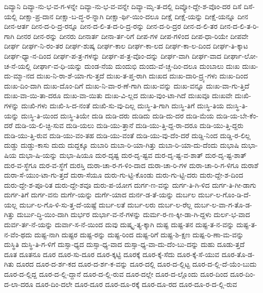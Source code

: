 {ದಿವ್ಯಾನಿ
ದಿವ್ಯಾ-ನು-ಭ-ವ-ಗ-ಳನ್ನೇ
ದಿವ್ಯಾ-ನು-ಭ-ವ-ವನ್ನೇ
ದಿವ್ಯಾ-ಮೃ-ತ-ದಲ್ಲಿ
ದಿವ್ಯೋ-ದ್ದೇ-ಶ-ವೊಂ-ದರ
ದಿಸೆ
ದಿಸೆ-ಯಲ್ಲಿ
ದೀಕ್ಷಾ-ಪ್ರ-ದಾನ
ದೀಕ್ಷಾ-ಬ-ದ್ಧ-ರ-ನ್ನಾಗಿ
ದೀಕ್ಷಾ-ರ್ಥಿ-ಯಿಂ-ದಲೂ
ದೀಕ್ಷೆ
ದೀಕ್ಷೆ-ಯನ್ನು
ದೀಕ್ಷೆ-ಯನ್ನೂ
ದೀನ
ದೀನ-ಆರ್ತ
ದೀನ-ದ-ರಿ-ದ್ರ-ರನ್ನೂ
ದೀನ-ದ-ಲಿ-ತ-ದ-ರಿ-ದ್ರ-ರನ್ನು
ದೀನ-ದ-ರಿ-ದ್ರರ
ದೀನ-ದ-ಲಿ-ತರ
ದೀನ-ದ-ಲಿ-ತ-ರಿ-ಗಾಗಿ
ದೀನರ
ದೀನ-ರನ್ನು
ದೀನರು
ದೀನಾರ್ತ
ದೀನಾ-ರ್ತ-ರಿಗೆ
ದೀಪ-ಗಳ
ದೀಪ-ಗಳಿಂದ
ದೀಪ-ಧಾ-ರಿಯೇ
ದೀಪವೇ
ದೀರ್ಘ
ದೀರ್ಘ-ನಿ-ರಂ-ತರ
ದೀರ್ಘ-ಶುಷ್ಕ
ದೀರ್ಘ-ಕಾಲ
ದೀರ್ಘ-ಕಾ-ಲದ
ದೀರ್ಘ-ಕಾ-ಲ-ದಿಂದ
ದೀರ್ಘ-ತಿ-ಕ್ಕಾಟ
ದೀರ್ಘ-ಧ್ಯಾ-ನ-ದಿಂದ
ದೀರ್ಘ-ಪ-ತ್ರ-ಗಳನ್ನು
ದೀರ್ಘ-ಪ-ತ್ರ-ವೊಂ-ದನ್ನು
ದೀರ್ಘ-ವಾಗಿ
ದೀರ್ಘ-ವಾದ
ದೀರ್ಘಾ-ಲೋ-ಚ-ನೆ-ಯಲ್ಲಿ
ದೀರ್ಘಾ-ವ-ಧಿ-ಯನ್ನು
ದುಂಡ-ನೆಯ
ದುಂದುಭಿ
ದುಂದು-ವೆ-ಚ್ಚ-ದಿಂ-ದಲೂ
ದುಂಬಾಲು
ದುಃಖ
ದುಃಖ-ದು-ಮ್ಮಾ-ನದ
ದುಃಖ-ನಿ-ರಾ-ಶೆ-ಯಾ-ಗು-ತ್ತದೆ
ದುಃಖ-ತ-ಪ್ತ-ರಾಗಿ
ದುಃಖದ
ದುಃಖ-ದಾರಿ-ದ್ರ್ಯ-ಗಳು
ದುಃಖ-ದಿಂದ
ದುಃಖ-ದಿಂ-ದಾಗಿ
ದುಃಖ-ದೊಂ-ದಿಗೆ
ದುಃಖ-ನಿ-ವಾ-ರ-ಣೆ-ಗಾಗಿ
ದುಃಖ-ವನ್ನು
ದುಃಖ-ವನ್ನೂ
ದುಃಖ-ವಾ-ಗು-ತ್ತಿದೆ
ದುಃಖ-ವಾ-ಯಿ-ತಾ-ದರೂ
ದುಃಖ-ವಾ-ಯಿತು
ದುಃಖ-ವಿ-ಲ್ಲದ
ದುಃಖ-ವುಂ-ಟಾ-ಗಿದೆ
ದುಃಖವೂ
ದುಃಖವೇ
ದುಃಖಿ-ಗಳನ್ನು
ದುಃಖಿ-ಗಳು
ದುಃಖಿ-ಸಿ-ದ-ನಂತೆ
ದುಃಖಿ-ಸು-ವು-ದಿಲ್ಲ
ದುಃಸ್ಥಿ-ತಿ-ಗಾಗಿ
ದುಃಸ್ಥಿ-ತಿಗೆ
ದುಃಸ್ಥಿ-ತಿಯ
ದುಃಸ್ಥಿ-ತಿ-ಯನ್ನು
ದುಃಸ್ಥಿ-ತಿ-ಯಿಂದ
ದುಃಸ್ಥಿ-ತಿಯೇ
ದುಡಿ
ದುಡಿ-ದರು
ದುಡಿದು
ದುಡಿ-ದು-ದರ
ದುಡಿ-ಮೆಯ
ದುಡಿ-ಯ-ಬೇ-ಕೆಂ-ದರೆ
ದುಡಿ-ಯ-ಲಿ-ಚ್ಛಿ-ಸುವ
ದುಡಿ-ಯಲು
ದುಡಿ-ಯು-ತ್ತಾನೆ
ದುಡಿ-ಯು-ತ್ತಿ-ದ್ದ-ರಾ-ದರೂ
ದುಡಿ-ಯು-ತ್ತಿ-ದ್ದರು
ದುಡಿ-ಯು-ತ್ತಿ-ರುವ
ದುಡಿ-ಯು-ವಂ-ತಹ
ದುಡಿ-ಯು-ವಂತೆ
ದುಡಿ-ಯು-ವು-ದೆಂ-ದರೆ
ದುಡ್ಡಿ-ನಿಂದ
ದುಡ್ಡಿ-ರ-ಲಿಲ್ಲ
ದುಡ್ಡು
ದುಡ್ಡು-ಕಾಸು
ದುದು
ದುದ್ದಕ್ಕೂ
ದುಬಾರಿ
ದುಬಾ-ರಿ-ಯಾ-ಗಿತ್ತು
ದುಬಾ-ರಿ-ಯಾ-ದು-ದೆಂದು
ದುಭಾಷಿ
ದುಭಾ-ಷಿಯ
ದುಭಾ-ಷಿ-ಯನ್ನು
ದುಭಾ-ಷಿಯೂ
ದುರ-ದೃಷ್ಟ
ದುರ-ದೃ-ಷ್ಟವ
ದುರ-ದೃ-ಷ್ಟ-ವ-ಶಾತ್
ದುರ-ದೃ-ಷ್ಟ-ಶಾತ್
ದುರ-ವ-ಸ್ಥೆಗೂ
ದುರ-ವ-ಸ್ಥೆಗೆ
ದುರಸ್ತಿ
ದುರಾ-ಚಾ-ರ-ಗ-ಳಿಂ-ದಾದ
ದುರಾ-ಚಾ-ರಿ-ಗಳ
ದುರಾ-ಚಾ-ರಿ-ಗ-ಳಿಗೂ
ದುರಾಶೆ
ದುರಾ-ಸೆ-ಯುಂ-ಟಾ-ಗು-ತ್ತದೆ
ದುರಾ-ಸೆಯೂ
ದುರು-ಗು-ಟ್ಟಿ-ಕೊಂಡು
ದುರು-ಗು-ಟ್ಟಿ-ದರು
ದುರು-ದ್ದೇ-ಶ-ದಿಂದ
ದುರು-ದ್ದೇ-ಶ-ಪೂ-ರಿತ
ದುರು-ದ್ದೇ-ಶವೂ
ದುರು-ಪ-ಯೋಗ
ದುರ್ಗ-ಣ-ವನ್ನು
ದುರ್ಗ-ತಿ-ಗಿ-ಳಿದ
ದುರ್ಗ-ತಿ-ಗೀ-ಡಾಗು
ದುರ್ಗ-ತಿಗೆ
ದುರ್ಗ-ವನು
ದುರ್ಗೆ-ಯನ್ನು
ದುರ್ಗೆ-ಯಾದ
ದುರ್ನ-ಡ-ತೆ-ಯನ್ನು
ದುರ್ಬಲ
ದುರ್ಬ-ಲ-ಗೊಂ-ಡಿ-ದೆ-ಯಲ್ಲ
ದುರ್ಬ-ಲ-ಗೊ-ಳಿ-ಸು-ತ್ತ-ದೆ-ಯಷ್ಟೆ
ದುರ್ಬ-ಲತೆ
ದುರ್ಬ-ಲರು
ದುರ್ಬ-ಲ-ರೆಲ್ಲ
ದುರ್ಬ-ಲ-ವಾ-ಗ-ತೊ-ಡ-ಗಿತ್ತು
ದುರ್ಬು-ದ್ಧಿ-ಯಿಂ-ದಾಗಿ
ದುರ್ಭರ
ದುರ್ಭಾ-ವ-ನೆ-ಗಳನ್ನು
ದುರ್ಮ-ರ-ಣ-ಕ್ಕೀ-ಡಾ-ಗಿ-ದ್ದಳು
ದುರ್ಲ-ಭ-ವಾದ
ದುರ್ವ-ರ್ತ-ನೆ-ಯನ್ನು
ದುರ್ವಾ-ಸ-ನೆ-ಯಿಂದ
ದುವು
ದುಷ್ಕೃ-ತ್ಯ-ಕ್ಕಾಗಿ
ದುಷ್ಟ
ದುಷ್ಟ-ತನ
ದುಷ್ಟ-ತ-ನ-ವನ್ನು
ದುಷ್ಟ-ತ-ನ-ವೆಂ-ಥದು
ದುಷ್ಟ-ನಾಗಿ
ದುಷ್ಟರ
ದುಷ್ಟ-ರನ್ನು
ದುಷ್ಟ-ರಿಂದ
ದುಷ್ಟ-ರಿಗೆ
ದುಷ್ಟ-ಶಿ-ಕ್ಷಣ
ದುಷ್ಪ-ರಿ-ಣಾ-ಮ-ವನ್ನು
ದುಸ್ಥಿತಿ
ದುಸ್ಥಿ-ತಿ-ಗ-ಳಿಗೆ
ದುಸ್ಸಾ-ಧ್ಯದ
ದುಸ್ಸಾ-ಧ್ಯ-ವಾದ
ದುಸ್ಸಾ-ಧ್ಯ-ವಾ-ದು-ದೆಂ-ಬು-ದನ್ನು
ದುಹು
ದೂಡು-ತ್ತದೆ
ದೂತ
ದೂತನೂ
ದೂರ
ದೂರ-ಸು-ದೂರ
ದೂರ-ಕ್ಕಟ್ಟಿ
ದೂರಕ್ಕೆ
ದೂರ-ಕ್ಕೆ-ಸೆದು
ದೂರ-ಕ್ಕೆ-ಸೆ-ಯುವ
ದೂರ-ತೊ-ಡ-ಗಿತು
ದೂರದ
ದೂರ-ದ-ರ್ಶ-ಕದ
ದೂರ-ದ-ರ್ಶ-ಕ-ವನ್ನು
ದೂರ-ದಲ್ಲಿ
ದೂರ-ದ-ಲ್ಲಿಟ್ಟ
ದೂರ-ದ-ಲ್ಲಿ-ದೆ-ಯೆಂ-ಬುದು
ದೂರ-ದ-ಲ್ಲಿದ್ದ
ದೂರ-ದ-ಲ್ಲಿ-ದ್ದಾನೆ
ದೂರ-ದ-ಲ್ಲಿ-ರುವ
ದೂರ-ದಲ್ಲೇ
ದೂರ-ದ-ಲ್ಲೊಂದು
ದೂರ-ದಿಂದ
ದೂರ-ದಿಂ-ದ-ಲಾ-ದರೂ
ದೂರ-ದಿಂ-ದಲೇ
ದೂರ-ದೂರ
ದೂರ-ದೂ-ರಕ್ಕೆ
ದೂರ-ದೂ-ರದ
ದೂರ-ದೂ-ರ-ದ-ಲ್ಲಿ-ರುವ
}
